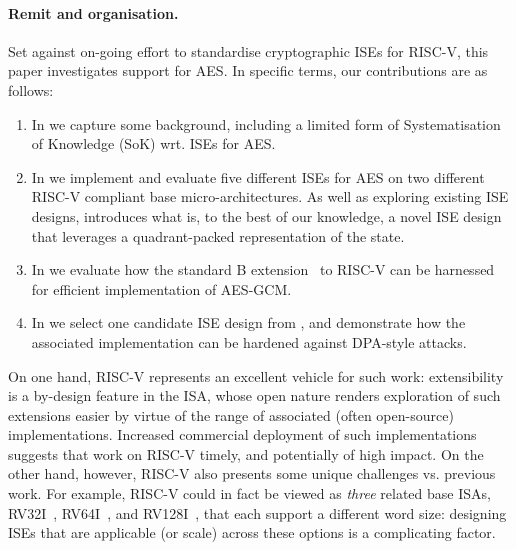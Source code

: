 
\paragraph{Remit and organisation.}

Set against on-going effort to standardise cryptographic ISEs for RISC-V,
this paper investigates support for AES.
In specific terms, our contributions are as follows:

\begin{enumerate}

\item In 
      we capture some background, including a limited form of
      Systematisation of Knowledge (SoK)
      wrt. ISEs for AES.

\item In 
      we implement and evaluate five different ISEs for AES on two different 
      RISC-V compliant base micro-architectures.
      As well as exploring existing ISE designs, 
      introduces what is, to the best of our knowledge, a novel ISE design 
      that leverages a quadrant-packed representation of the state.

\item In
      we evaluate how the
      standard 
      B 
      extension~\cite[Section 21]{RV:ISA:I:19}
      to RISC-V can be harnessed for efficient implementation of AES-GCM.

\item In
      we select one candidate ISE design from 
      ,
      and demonstrate how the associated implementation can be hardened
      against DPA-style attacks.

\end{enumerate}

\noindent
On one hand, 
RISC-V represents an excellent vehicle for such work:
extensibility is a by-design feature in the ISA, whose open nature renders
exploration of such extensions easier by virtue of the range of associated 
(often open-source) implementations.  
Increased commercial deployment of such implementations suggests that work 
on RISC-V timely, and potentially of high impact.
On the other hand, however,
RISC-V also presents some unique challenges vs. previous work.
For example,
RISC-V could in fact be viewed as {\em three} related base ISAs,
 RV32I~\cite[Section 2]{RV:ISA:I:19},
 RV64I~\cite[Section 5]{RV:ISA:I:19},
and
RV128I~\cite[Section 6]{RV:ISA:I:19},
that each support a different word size:
designing ISEs that are applicable (or scale) across these options is a
complicating factor.

%

